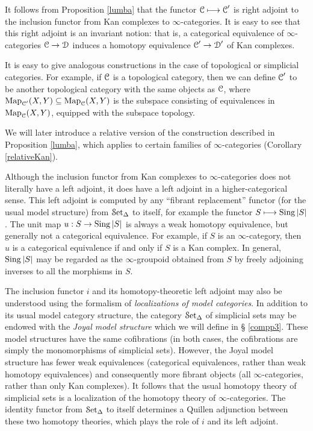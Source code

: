 \begin{1.2.5 inf-gpoids and classical homotopy}
It follows from Proposition \ref{lumba} that the functor
$\operatorname{\mathcal{C}} \longmapsto \operatorname{\mathcal{C}}'$ is right adjoint to
the inclusion functor from Kan complexes to $\infty$-categories. It is easy to see that this right adjoint is an invariant notion: that is, a categorical equivalence of $\infty$-categories $\operatorname{\mathcal{C}} \rightarrow \operatorname{\mathcal{D}}$ induces a homotopy equivalence
$\operatorname{\mathcal{C}}' \rightarrow \operatorname{\mathcal{D}}'$ of Kan complexes. 

\begin{remark}
It is easy to give analogous constructions in the case of topological or simplicial categories. For example, if $\operatorname{\mathcal{C}}$ is a topological category, then we can define $\operatorname{\mathcal{C}}'$ to be another topological category with the same objects as $\operatorname{\mathcal{C}}$, where $\operatorname{{Map}}_{\operatorname{\mathcal{C}}'}(X,Y) \subseteq \operatorname{{Map}}_{\operatorname{\mathcal{C}}}(X,Y)$ is the subspace consisting of equivalences in $\operatorname{{Map}}_{\operatorname{\mathcal{C}}}(X,Y)$, equipped with the subspace topology.
\end{remark}

\begin{remark}
We will later introduce a relative version of the construction described in Proposition \ref{lumba}, which applies to certain families of $\infty$-categories (Corollary \ref{relativeKan}).
\end{remark}

Although the inclusion functor from Kan complexes to $\infty$-categories does not
literally have a left adjoint, it does have a left adjoint in a higher-categorical sense. This left adjoint is computed by any ``fibrant replacement'' functor (for the usual model structure) from $\operatorname{\mathcal{S}et_{\Delta}}$ to itself, for
example the functor $S \longmapsto \operatorname{Sing} |S|$.
The unit map $u: S \rightarrow
\operatorname{Sing} |S|$ is always a weak homotopy equivalence, but generally not a categorical equivalence. For example, if $S$ is an $\infty$-category, then $u$ is a categorical equivalence if and only if $S$ is a Kan complex. In general, $\operatorname{Sing} |S|$ may be regarded as the $\infty$-groupoid
obtained from $S$ by freely adjoining inverses to all the
morphisms in $S$.

\begin{remark}
The inclusion functor $i$ and its homotopy-theoretic left adjoint
may also be understood using the formalism of {\it
localizations of model categories}. In addition to its usual model
category structure, the category $\operatorname{\mathcal{S}et_{\Delta}}$ of simplicial sets may be
endowed with the {\it Joyal model structure} which we will define in \S
\ref{compp3}. These model structures have the same cofibrations (in both cases, the
cofibrations are simply the monomorphisms of simplicial sets).
However, the Joyal model structure has fewer weak equivalences
(categorical equivalences, rather than weak homotopy equivalences)
and consequently more fibrant objects (all $\infty$-categories,
rather than only Kan complexes). It follows that the usual
homotopy theory of simplicial sets is a
localization of the homotopy theory of $\infty$-categories. The
identity functor from $\operatorname{\mathcal{S}et_{\Delta}}$ to itself determines a Quillen
adjunction between these two homotopy theories, which plays the
role of $i$ and its left adjoint.
\end{remark}
\end{1.2.5 inf-gpoids and classical homotopy}
